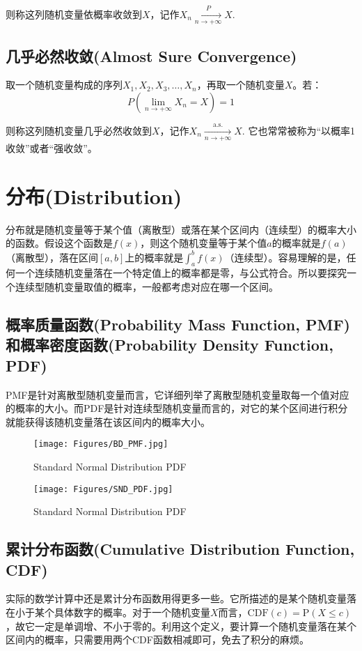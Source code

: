 \documentclass[UTF8]{ctexbook}
\begin{document}
则称这列随机变量依概率收敛到$X$，记作$X_n\xrightarrow[n\to+\infty]{P}X$.
\section{几乎必然收敛(Almost Sure Convergence)}
取一个随机变量构成的序列$X_1,X_2,X_3,\dots,X_n$，再取一个随机变量$X$。若：
\[
	P(\lim_{n\to+\infty}X_n=X)=1
\]

则称这列随机变量几乎必然收敛到$X$，记作$X_n\xrightarrow[n\to+\infty]{\mathrm{a.s.}}X$. 它也常常被称为“以概率1收敛”或者“强收敛”。
\chapter{分布(Distribution)}
分布就是随机变量等于某个值（离散型）或落在某个区间内（连续型）的概率大小的函数。假设这个函数是$f(x)$，则这个随机变量等于某个值$a$的概率就是$f(a)$（离散型），落在区间$[a,b]$上的概率就是$\int_a^bf(x)$（连续型）。容易理解的是，任何一个连续随机变量落在一个特定值上的概率都是零，与公式符合。所以要探究一个连续型随机变量取值的概率，一般都考虑对应在哪一个区间。
\section{概率质量函数(Probability Mass Function, PMF)和概率密度函数(Probability Density Function, PDF)}
\label{pmf-pdf}
PMF是针对离散型随机变量而言，它详细列举了离散型随机变量取每一个值对应的概率的大小。而PDF是针对连续型随机变量而言的，对它的某个区间进行积分就能获得该随机变量落在该区间内的概率大小。
\begin{figure}[ht]
	\begin{minipage}{0.45\textwidth}
		\centering
		\texttt{[image: Figures/BD\_PMF.jpg]}
		\caption{Standard Normal Distribution PDF}
	\label{fig:Bin_PMF}
	\end{minipage}
	\begin{minipage}{0.45\textwidth}
		\centering
		\texttt{[image: Figures/SND\_PDF.jpg]}
		\caption{Standard Normal Distribution PDF}
	\end{minipage}
\end{figure}

\section{累计分布函数(Cumulative Distribution Function, CDF)}
\label{cdf}
实际的数学计算中还是累计分布函数用得更多一些。它所描述的是某个随机变量落在小于某个具体数字的概率。对于一个随机变量$X$而言，$\mathrm{CDF}(c)=\mathrm{P}(X\leq c)$，故它一定是单调增、不小于零的。利用这个定义，要计算一个随机变量落在某个区间内的概率，只需要用两个CDF函数相减即可，免去了积分的麻烦。
\end{document}
